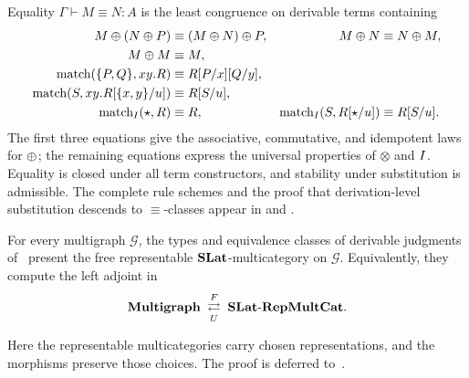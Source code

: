 \begin{definition}[Equality]
\label{def:slat_equality}
Equality $\Gamma\vdash M\equiv N:A$ is the least congruence on derivable terms containing
\begin{align*}
M\mathbin{\oplus}(N\mathbin{\oplus} P)&\equiv(M\mathbin{\oplus} N)\mathbin{\oplus} P,
&M\mathbin{\oplus} N&\equiv N\mathbin{\oplus} M,\\
M\mathbin{\oplus} M&\equiv M,\\
\text{match}(\{P,Q\},xy.R)&\equiv R[P/x][Q/y],\\
\text{match}(S,xy.R[\{x,y\}/u])&\equiv R[S/u],\\
\text{match}_{I}(\star,R)&\equiv R,
&\text{match}_{I}(S,R[\star/u])&\equiv R[S/u].
\end{align*}
The first three equations give the associative, commutative, and idempotent
laws for $\mathbin{\oplus}$; the remaining equations express the universal properties of
$\otimes$ and $I$.  Equality is closed under all term constructors, and
stability under substitution is admissible.  The complete rule schemes and
the proof that derivation-level substitution descends to $\equiv$-classes
appear in  and
.
\end{definition}

\begin{theorem}[Initiality]
\label{theorem:free_slat_multicat}
For every multigraph $\mathcal G$, the types and equivalence classes of derivable judgments of~ present the free representable $\mathbf{SLat}$-multicategory on $\mathcal G$.  Equivalently, they compute the left adjoint in
\[
\mathbf{Multigraph}
\;\underset{U}{\stackrel{F}{\rightleftarrows}}\;
\mathbf{SLat}\text{-}\mathbf{RepMultCat}.
\]
\end{theorem}
Here the representable multicategories carry chosen representations, and the
morphisms preserve those choices.  The proof is deferred
to~.

